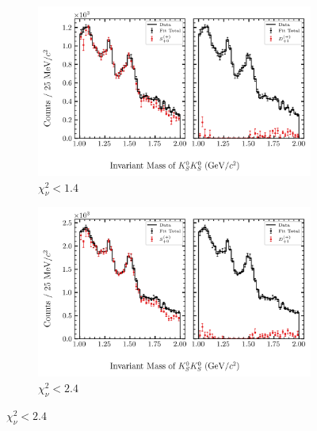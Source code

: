 \begin{figure}[htbp]
    \centering
    \begin{subfigure}{0.45\textwidth}
        \includegraphics[width=\linewidth]{figures/binned_fit_chisqdof_1.4_splot_D_1s_2b_phase_factor_waves489_uncertainty_bootstrap-CI-BC.png}
        \caption{$\chi^2_\nu < 1.4$}
    \end{subfigure}
    \hfill
    \begin{subfigure}{0.45\textwidth}
        \includegraphics[width=\linewidth]{figures/binned_fit_chisqdof_2.4_splot_D_1s_2b_phase_factor_waves489_uncertainty_bootstrap-CI-BC.png}
        \caption{$\chi^2_\nu < 2.4$}
    \end{subfigure}

    \vspace{1em}


\end{figure}
